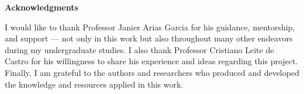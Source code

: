 
\begin{center}
\huge{{\bf Acknowledgments}}
\vspace{4cm}
\end{center}

I would like to thank Professor Janier Arias Garcia for his guidance, mentorship, and support — not only in this work but also throughout many other endeavors during my undergraduate studies. I also thank Professor Cristiano Leite de Castro for his willingness to share his experience and ideas regarding this project. Finally, I am grateful to the authors and researchers who produced and developed the knowledge and resources applied in this work.

\clearpage
\thispagestyle{empty}
\cleardoublepage
